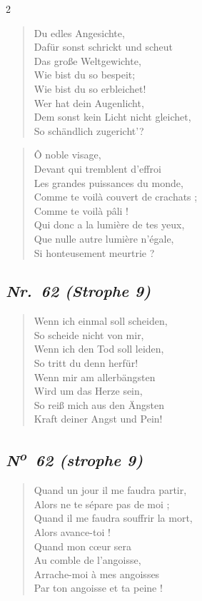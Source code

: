 \documentclass[a4paper,12pt]{article}
\newcommand\chunks[2]{%
\begin{leftcolumn*}\begin{otherlanguage}{german}%
{#1}%
\end{otherlanguage}\end{leftcolumn*}%
\begin{rightcolumn}\begin{otherlanguage}{french}%
{#2}%
\end{otherlanguage}\end{rightcolumn}%
}
\newcommand\strophe[1]{\subsection*{\normalsize\normalfont\itshape #1}}
\begin{document}
\begin{paracol}{2}
  \chunks{\begin{verse}
          Du edles Angesichte,\\
          Dafür sonst schrickt und scheut\\
          Das große Weltgewichte,\\
          Wie bist du so bespeit;\\
          Wie bist du so erbleichet!\\
          Wer hat dein Augenlicht,\\
          Dem sonst kein Licht nicht gleichet,\\
          So schändlich zugericht’?
          \end{verse}}
         {\begin{verse}
          Ô noble visage,\\
          Devant qui tremblent d’effroi\\
          Les grandes puissances du monde,\\
          Comme te voilà couvert de crachats ;\\
          Comme te voilà pâli !\\
          Qui donc a la lumière de tes yeux,\\
          Que nulle autre lumière n’égale,\\
          Si honteusement meurtrie ?
          \end{verse}}

  \chunks{\strophe{Nr.~62 (Strophe 9)}
          \begin{verse}
          Wenn ich einmal soll scheiden,\\
          So scheide nicht von mir,\\
          Wenn ich den Tod soll leiden,\\
          So tritt du denn herfür!\\
          Wenn mir am allerbängsten\\
          Wird um das Herze sein,\\
          So reiß mich aus den Ängsten\\
          Kraft deiner Angst und Pein!
          \end{verse}}
         {\strophe{N\textsuperscript{o}~62 (strophe 9)}
          \begin{verse}
          Quand un jour il me faudra partir,\\
          Alors ne te sépare pas de moi ;\\
          Quand il me faudra souffrir la mort,\\
          Alors avance-toi !\\
          Quand mon cœur sera\\
          Au comble de l’angoisse,\\
          Arrache-moi à mes angoisses\\
          Par ton angoisse et ta peine !
          \end{verse}}
\end{paracol}
\end{document}
